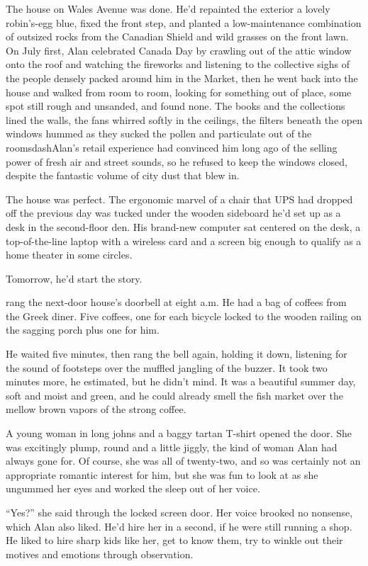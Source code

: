 The house on Wales Avenue was done.  He'd repainted the exterior a
lovely robin's-egg blue, fixed the front step, and planted a
low-maintenance combination of outsized rocks from the Canadian Shield
and wild grasses on the front lawn.  On July first, Alan celebrated
Canada Day by crawling out of the attic window onto the roof and
watching the fireworks and listening to the collective sighs of the
people densely packed around him in the Market, then he went back into
the house and walked from room to room, looking for something out of
place, some spot still rough and unsanded, and found none.  The books
and the collections lined the walls, the fans whirred softly in the
ceilings, the filters beneath the open windows hummed as they sucked
the pollen and particulate out of the roomsdash{}Alan's retail experience
had convinced him long ago of the selling power of fresh air and
street sounds, so he refused to keep the windows closed, despite the
fantastic volume of city dust that blew in.

The house was perfect.  The ergonomic marvel of a chair that UPS had
dropped off the previous day was tucked under the wooden sideboard
he'd set up as a desk in the second-floor den.  His brand-new computer
sat centered on the desk, a top-of-the-line laptop with a wireless
card and a screen big enough to qualify as a home theater in some
circles.

Tomorrow, he'd start the story.

 rang the next-door house's doorbell at eight a.m.  He had a bag
of coffees from the Greek diner.  Five coffees, one for each bicycle
locked to the wooden railing on the sagging porch plus one for him.

He waited five minutes, then rang the bell again, holding it down,
listening for the sound of footsteps over the muffled jangling of the
buzzer.  It took two minutes more, he estimated, but he didn't mind. 
It was a beautiful summer day, soft and moist and green, and he could
already smell the fish market over the mellow brown vapors of the
strong coffee.

A young woman in long johns and a baggy tartan T-shirt opened the
door.  She was excitingly plump, round and a little jiggly, the kind
of woman Alan had always gone for.  Of course, she was all of
twenty-two, and so was certainly not an appropriate romantic interest
for him, but she was fun to look at as she ungummed her eyes and
worked the sleep out of her voice.

``Yes?'' she said through the locked screen door.  Her voice brooked
no nonsense, which Alan also liked.  He'd hire her in a second, if he
were still running a shop.  He liked to hire sharp kids like her, get
to know them, try to winkle out their motives and emotions through
observation.

